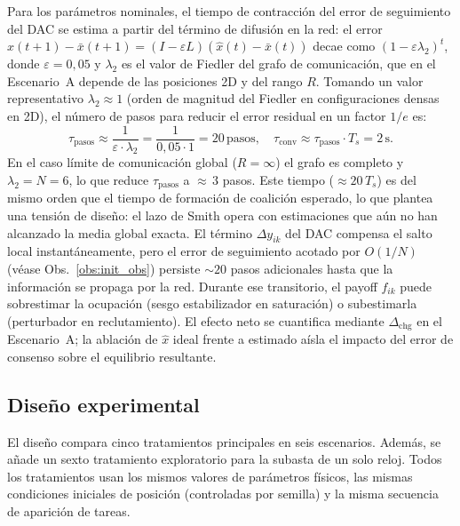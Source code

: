 \begin{observacion}
Para los parámetros nominales, el tiempo de contracción del error de seguimiento
del DAC se estima a partir del término de difusión en la red: el error
$\hat{x}(t{+}1) - \bar{x}(t{+}1) = (I - \varepsilon L)(\hat{x}(t) - \bar{x}(t))$
decae como $(1 - \varepsilon\lambda_2)^t$, donde $\varepsilon = 0{,}05$ y $\lambda_2$
es el valor de Fiedler del grafo de comunicación, que en el Escenario~A depende de
las posiciones 2D y del rango $R$. Tomando un valor representativo $\lambda_2 \approx 1$
(orden de magnitud del Fiedler en configuraciones densas en 2D), el número de pasos
para reducir el error residual en un factor $1/e$ es:
\[
  \tau_{\mathrm{pasos}} \approx \frac{1}{\varepsilon \cdot \lambda_2}
  = \frac{1}{0{,}05 \cdot 1} = 20\,\text{pasos},
  \quad
  \tau_{\mathrm{conv}} \approx \tau_{\mathrm{pasos}} \cdot T_s = 2\,\text{s}.
\]
En el caso límite de comunicación global ($R = \infty$) el grafo es completo y
$\lambda_2 = N = 6$, lo que reduce $\tau_{\mathrm{pasos}}$ a ${\approx}\,3$ pasos.
Este tiempo (${\approx}20\,T_s$) es del mismo orden que el tiempo de formación de
coalición esperado, lo que plantea una tensión de diseño: el lazo de Smith
opera con estimaciones que aún no han alcanzado la media global exacta.
El término $\Delta y_{ik}$ del DAC compensa el salto local instantáneamente,
pero el error de seguimiento acotado por $O(1/N)$ (véase Obs.~\ref{obs:init_obs})
persiste $\sim 20$ pasos adicionales hasta que la información se propaga por la red.
Durante ese transitorio, el payoff $f_{ik}$ puede sobrestimar la ocupación (sesgo
estabilizador en saturación) o subestimarla (perturbador en reclutamiento).
El efecto neto se cuantifica mediante $\Delta_{\mathrm{chg}}$ en el Escenario~A;
la ablación de $\hat{x}$ ideal frente a estimado aísla el impacto del error
de consenso sobre el equilibrio resultante.
\end{observacion}

\subsection{Diseño experimental}
\label{subsec:experimental}

El diseño compara cinco tratamientos principales en seis escenarios. Además, se añade
un sexto tratamiento exploratorio para la subasta de un solo reloj. Todos los tratamientos
usan los mismos valores de parámetros físicos, las mismas condiciones iniciales
de posición (controladas por semilla) y la misma secuencia de aparición de tareas.

